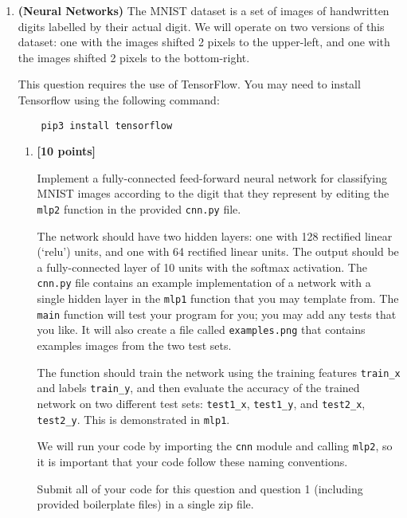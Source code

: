 \documentclass{article}
\newcounter{totalpoints}
\newcommand{\points}[1]{{\addtocounter{totalpoints}{#1}\textbf{[#1 points]}}}
\begin{document}
\pagestyle{myheadings}

\begin{enumerate}

\item \textbf{(Neural Networks)}
The MNIST dataset is a set of images of handwritten digits labelled by their actual digit.
We will operate on two versions of this dataset: one with the images shifted 2 pixels to the upper-left, and one with the images shifted 2 pixels to the bottom-right.

This question requires the use of TensorFlow.  You may need to install Tensorflow using the following command:
\begin{verbatim}
    pip3 install tensorflow
\end{verbatim}

\begin{enumerate}
\item\points{10}
Implement a fully-connected feed-forward neural network for classifying MNIST images according to the digit that they represent by editing the \verb|mlp2| function in the provided \texttt{cnn.py} file.

The network should have two hidden layers: one with 128 rectified linear (`relu') units, and one with 64 rectified linear units.  The output should be a fully-connected layer of 10 units with the softmax activation.  The \texttt{cnn.py} file contains an example implementation of a network with a single hidden layer in the \verb|mlp1| function that you may template from.  The \verb|main| function will test your program for you; you may add any tests that you like.
It will also create a file called \texttt{examples.png} that contains examples images from the two test sets.

The function should train the network using the training features \verb|train_x| and labels \verb|train_y|, and then evaluate the accuracy of the trained network on two different test sets: \verb|test1_x|, \verb|test1_y|, and \verb|test2_x|, \verb|test2_y|.
This is demonstrated in \verb|mlp1|.

We will run your code by importing the \verb|cnn| module and calling \verb|mlp2|, so it is important that your code follow these naming conventions.

Submit all of your code for this question and question 1 (including provided boilerplate files) in a single zip file.


\end{enumerate}
\end{enumerate}
\end{document}
